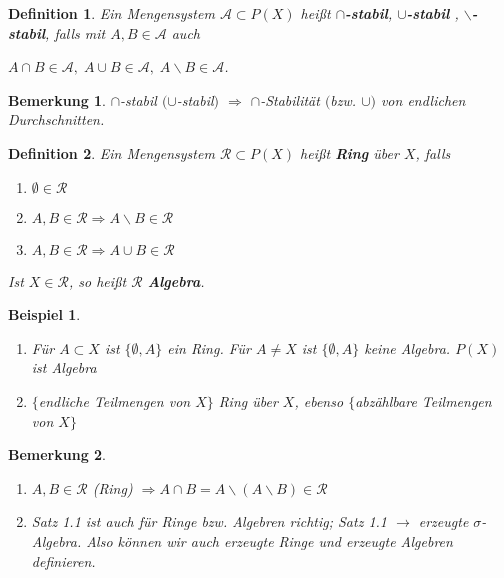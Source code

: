 \documentclass[11pt]{memoir}
\theoremstyle{changebreak}
\newtheorem{Definition}{Definition}[chapter]
\newtheorem{Bemerkung}{Bemerkung}[chapter]
\newtheorem{Beispiel}{Beispiel}[chapter]
\begin{document}
\begin{Definition}
Ein Mengensystem $\mathscr A \subset P(X)$ heißt \textbf{$\cap$-stabil}, \textbf{ $\cup$-stabil }, \textbf{$\backslash$-stabil}, falls mit $A, B \in \mathscr A$ auch 
\begin{center}
	$A \cap B \in \mathscr A, \; A \cup B \in \mathscr A, \; A\backslash B \in \mathscr A$.
\end{center}
\end{Definition}

\begin{Bemerkung}
$\cap$-stabil $(\cup$-stabil$)$ $\Rightarrow$ $\cap$-Stabilität $($bzw. $\cup)$ von endlichen Durchschnitten.
\end{Bemerkung}

\begin{Definition}
Ein Mengensystem $\mathscr R \subset P(X)$ heißt \textbf{Ring} über $X$, falls
\begin{enumerate}
	\item $\emptyset \in \mathscr R$
	\item $A, B \in \mathscr R \Rightarrow A\backslash B \in \mathscr R$
	\item $A, B \in \mathscr R \Rightarrow A \cup B \in \mathscr R$
\end{enumerate}
Ist $X \in \mathscr R$, so heißt $\mathscr R$ \textbf{Algebra}.
\end{Definition}


\begin{Beispiel}
\begin{enumerate}
	\item Für $A \subset X$ ist $\{\emptyset, A\}$ ein Ring. Für $A \ne X$ ist $\{\emptyset, A\}$ keine Algebra. $P(X)$ ist Algebra
	\item $\{$endliche Teilmengen von $X\}$ Ring über $X$, ebenso $\{ $abzählbare Teilmengen von $X\}$
\end{enumerate}
\end{Beispiel}

\begin{Bemerkung}
\begin{enumerate}
	\item $A, B \in \mathscr R$ (Ring) $\Rightarrow A \cap B = A \backslash (A \backslash B) \in \mathscr R$
	 \item Satz 1.1 ist auch für Ringe bzw. Algebren richtig; Satz 1.1 $\rightarrow$ erzeugte $\sigma$-Algebra. Also können wir auch erzeugte Ringe und erzeugte Algebren definieren.
\end{enumerate}
\end{Bemerkung}
\end{document}
